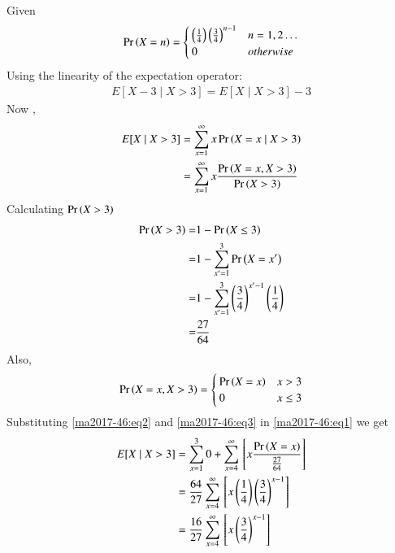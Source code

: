 
Given\begin{align}\label{ma2017-46:5}
\Pr\left(X=n\right) = \begin{cases}
    \left(\frac{1}{4}\right)\left(\frac{3}{4}\right)^{n-1} & n=1,2 \ldots \\
    0 & otherwise
\end{cases}
\end{align}
Using the linearity of the expectation operator:
\begin{align}\label{ma2017-46:eq-1}
 E[X - 3 \mid X > 3] = E[X \mid X > 3] - 3
\end{align}
Now ,
\begin{align}
E[X \mid X > 3] &= \sum_{x=1}^{\infty} x  \Pr\left(X=x \mid X > 3\right)\\
& = \sum_{x=1}^{\infty} x \frac{\Pr\left(X=x, X > 3\right)}{\Pr\left(X > 3\right)}\label{ma2017-46:eq1}
\end{align}
Calculating $\Pr\left(X>3\right)$
\begin{align}
\Pr\left(X > 3\right) =& 1 - \Pr\left(X \leq 3\right)   \\
=& 1 - \sum_{x'=1}^3 \Pr\left(X=x'\right) \\
=& 1 - \sum_{x'=1}^3 \left(\frac{3}{4}\right)^{x'-1}\left(\frac{1}{4}\right)\\
=& \frac{27}{64} \label{ma2017-46:eq2}
\end{align}
Also,\begin{align}\label{ma2017-46:eq3}
\Pr\left(X=x, X > 3\right) = \begin{cases}
    \Pr\left(X=x\right) & x > 3 \\
    0 & x \leq 3
\end{cases}
\end{align}
Substituting \eqref{ma2017-46:eq2} and \eqref{ma2017-46:eq3} in  \eqref{ma2017-46:eq1} we get
\begin{align}
E[X \mid X > 3] 
&= \sum_{x=1}^{3} 0 + \sum_{x=4}^{\infty} {}\left[ x   \frac{\Pr\left(X=x\right)}{\frac{27}{64}} \right] \\
&=\frac{64}{27} \sum_{x=4}^{\infty} {}\left[  
x\left(\frac{1}{4}\right)\left(\frac{3}{4}\right)^{x-1}\right]\\
&=\frac{16}{27}\sum_{x=4}^{\infty} {}\left[ x \left(\frac{3}{4}\right)^{x-1}\right]\label{ma2017-46:sub}
\end{align}

